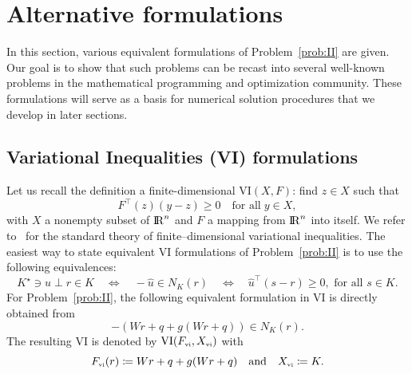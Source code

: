 {%

\section{Alternative formulations}
\label{sec:formulation}
In this section, various equivalent formulations of Problem~\ref{prob:II} are {given.
Our goal is to show that} such problems can be recast into several well-known problems in the mathematical programming and optimization community.
These formulations will serve as a basis for numerical solution procedures that we develop in later sections.

\subsection{Variational Inequalities (VI) formulations}

Let us recall the definition a finite-dimensional $\mathrm{VI}(X,F)$: find $z\in X$ such that 
\begin{equation}
  \label{eq:vi}
  F^\top(z)(y-z) \geq 0 \quad\text{for all}\; y \in X,
\end{equation}
with $X$ a nonempty subset of $\mathrm{I\!R}^n$ and $F$ a mapping from $\mathrm{I\!R}^n$ into itself. We refer to~\cite{Harker.Pang1990,Facchinei.Pang2003} for the standard  theory of finite--dimensional variational inequalities. The easiest way to state equivalent VI formulations of Problem~\ref{prob:II} is to use the following equivalences:
\begin{equation}
  \label{eq:SOCCP-1}
  K^\star \ni {\hat u} \perp r \in K \quad\Longleftrightarrow\quad
  - {\hat u} \in N_K(r) \quad \Longleftrightarrow\quad \hat u^\top (s -r) \geq 0, \text{ for all } s \in K.
\end{equation}
For Problem~\ref{prob:II}, the following equivalent formulation in VI is directly obtained from
\begin{equation}
  \label{eq:inclusion-1}
  -(W r + q + g(Wr+q))  \in N_K(r).
\end{equation}
 The resulting VI is denoted by $\mathrm{VI}(F_{{\hbox{\tiny{vi}}}},X_{{\hbox{\tiny{vi}}}})$ with
\begin{equation}
  \label{eq:vi-II}
  F_{\vitwo}(r) \coloneqq W r +q + g(Wr+q)\quad\text{and}\quad X_{\vitwo} \coloneqq K.
\end{equation}

}
